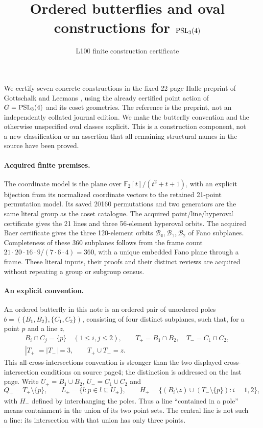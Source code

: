 \documentclass[11pt]{article}
\title{Ordered butterflies and oval constructions for $\operatorname{PSL}_3(4)$}
\author{L100 finite construction certificate}\date{}
\newcommand{\orb}{\mathcal B}\newcommand{\hyp}{\mathcal H}
\begin{document}
\maketitle
We certify seven concrete constructions in the fixed 22-page Halle preprint
of Gottschalk and Leemans \cite{GL}, using the already certified point action
of $G=\operatorname{PSL}_3(4)$ and its coset geometries. The reference is the preprint,
not an independently collated journal edition. We make the butterfly
convention and the otherwise unspecified oval classes explicit. This is
a construction component, not a new classification or an assertion that
all remaining structural names in the source have been proved.

\paragraph{Acquired finite premises.}
The coordinate model is the plane over
$\mathbb F_2[t]/(t^2+t+1)$, with an explicit bijection from its normalized
coordinate vectors to the retained 21-point permutation model. Its saved
20160 permutations and two generators are the same literal group as the
coset catalogue. The acquired point/line/hyperoval certificate gives the
21 lines and three 56-element hyperoval orbits. The acquired Baer certificate
gives the three 120-element orbits $\orb_0,\orb_1,\orb_2$ of Fano subplanes.
Completeness of these 360 subplanes follows from the frame count
$21\cdot20\cdot16\cdot9/(7\cdot6\cdot4)=360$, with a unique embedded
Fano plane through a frame. These literal inputs, their proofs and their
distinct reviews are acquired without repeating a group or subgroup census.

\paragraph{An explicit convention.}
An ordered butterfly in this note is an ordered pair of unordered poles
$b=(\{B_1,B_2\},\{C_1,C_2\})$, consisting of four distinct subplanes,
such that, for a point $p$ and a line $z$,
\[
 \begin{gathered}
 B_i\cap C_j=\{p\}\quad(1\leq i,j\leq2),\qquad
 T_+=B_1\cap B_2,\quad T_-=C_1\cap C_2,\\
 |T_+|=|T_-|=3,\qquad T_+\cup T_-=z.
 \end{gathered}                                           \tag{1}
\]
This all-cross-intersections convention is stronger than the two displayed
cross-intersection conditions on source page4; the distinction is addressed
on the last page. Write $U_+=B_1\cup B_2$, $U_-=C_1\cup C_2$ and
\[
 Q_+=T_+\setminus\{p\},\qquad
 L_\pm=\{l:p\in l\subseteq U_\pm\},\qquad
 H_+=\{(B_i\setminus z)\cup(T_-\setminus\{p\}):i=1,2\},
\]
with $H_-$ defined by interchanging the poles. Thus a line ``contained in
a pole'' means containment in the union of its two point sets. The central
line is not such a line: its intersection with that union has only three points.
\end{document}
